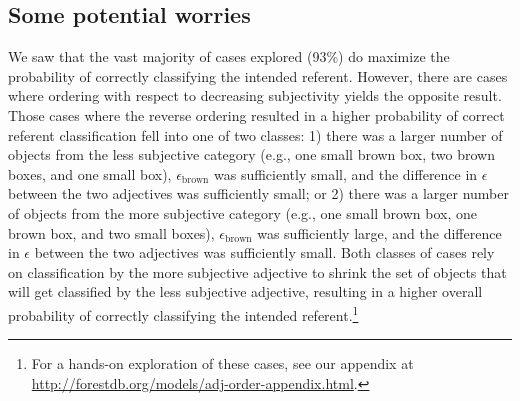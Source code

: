 \documentclass[preprint,authoryear]{elsarticle}\frenchspacing
\begin{document}
%




\subsection{Some potential worries}

We saw that the vast majority of cases explored (93\%) do maximize the probability of correctly classifying the intended referent. However, there are cases where ordering with respect to decreasing subjectivity yields the opposite result. Those cases where the reverse ordering resulted in a higher probability of correct referent classification fell into one of two classes: 1) there was a larger number of objects from the less subjective category (e.g., one small brown box, two brown boxes, and one small box), $\epsilon_{\textrm{brown}}$ was sufficiently small, and the difference in $\epsilon$ between the two adjectives was sufficiently small; or 2) there was a larger number of objects from the more subjective category (e.g., one small brown box, one brown box, and two small boxes), $\epsilon_{\textrm{brown}}$ was sufficiently large, and the difference in $\epsilon$ between the two adjectives was sufficiently small. Both classes of cases rely on classification by the more subjective adjective to shrink the set of objects that will get classified by the less subjective adjective, resulting in a higher overall probability of correctly classifying the intended referent.\footnote{For a hands-on exploration of these cases, see our appendix at \href{http://forestdb.org/models/adj-order-appendix.html}{http://forestdb.org/models/adj-order-appendix.html}.}
\end{document}
